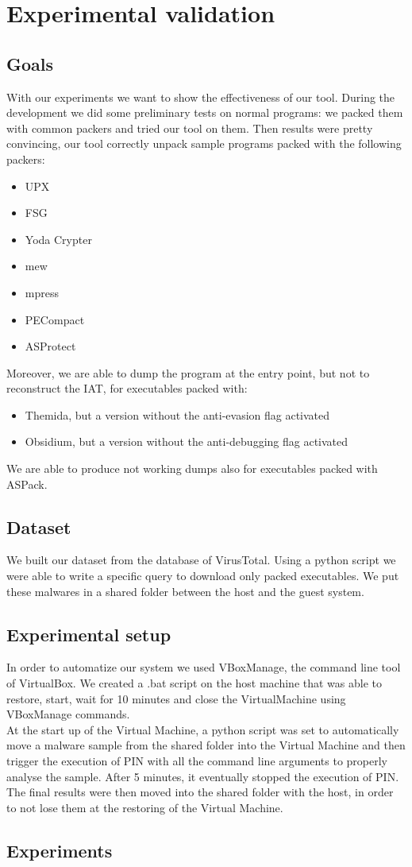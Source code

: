 \chapter{Experimental validation}
\label{chapter5}
\thispagestyle{empty}

\section{Goals}
With our experiments we want to show the effectiveness of our tool. During the development we did some preliminary tests on normal programs: we packed them with common packers and tried our tool on them. Then results were pretty convincing, our tool correctly unpack sample programs packed with the following packers:
\begin{itemize}
\item UPX
\item FSG
\item Yoda Crypter
\item mew
\item mpress
\item PECompact
\item ASProtect
\end{itemize}
Moreover, we are able to dump the program at the entry point, but not to reconstruct the IAT, for executables packed with:
\begin{itemize}
\item Themida, but a version without the anti-evasion flag activated
\item Obsidium, but a version without the anti-debugging flag activated
\end{itemize}
We are able to produce not working dumps also for executables packed with ASPack.

\section{Dataset}
We built our dataset from the database of VirusTotal. Using a python script we were able to write a specific query to download only packed executables. We put these malwares in a shared folder between the host and the guest system.

\section{Experimental setup}
In order to automatize our system we used VBoxManage, the command line tool of VirtualBox. We created a .bat script on the host machine that was able to restore, start, wait for 10 minutes and close the VirtualMachine using VBoxManage commands.\\
At the start up of the Virtual Machine, a python script was set to automatically move a malware sample from the shared folder into the Virtual Machine and then trigger the execution of PIN with all the command line arguments to properly analyse the sample. After 5 minutes, it eventually stopped the execution of PIN.\\
The final results were then moved into the shared folder with the host, in order to not lose them at the restoring of the Virtual Machine.

\section{Experiments}

